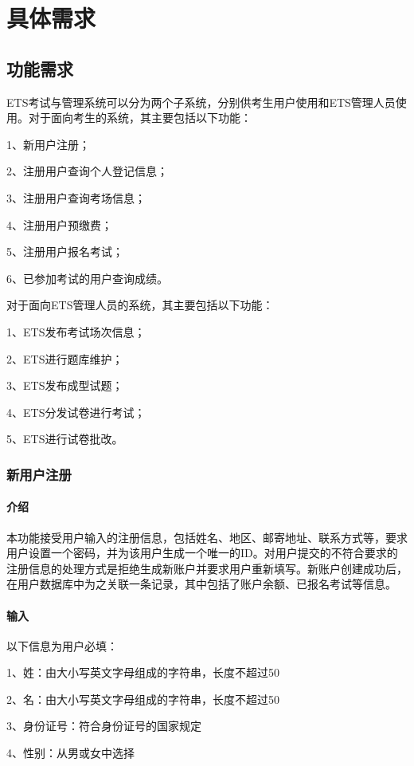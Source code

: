\chapter{具体需求}

\section{功能需求}
ETS考试与管理系统可以分为两个子系统，分别供考生用户使用和ETS管理人员使用。对于面向考生的系统，其主要包括以下功能：

1、新用户注册；

2、注册用户查询个人登记信息；

3、注册用户查询考场信息；

4、注册用户预缴费；

5、注册用户报名考试；

6、已参加考试的用户查询成绩。

对于面向ETS管理人员的系统，其主要包括以下功能：

1、ETS发布考试场次信息；

2、ETS进行题库维护；

3、ETS发布成型试题；

4、ETS分发试卷进行考试；

5、ETS进行试卷批改。

\subsection{新用户注册}

\subsubsection{介绍}
本功能接受用户输入的注册信息，包括姓名、地区、邮寄地址、联系方式等，要求用户设置一个密码，并为该用户生成一个唯一的ID。对用户提交的不符合要求的注册信息的处理方式是拒绝生成新账户并要求用户重新填写。新账户创建成功后，在用户数据库中为之关联一条记录，其中包括了账户余额、已报名考试等信息。

\subsubsection{输入}
以下信息为用户必填：

1、姓：由大小写英文字母组成的字符串，长度不超过50

2、名：由大小写英文字母组成的字符串，长度不超过50

3、身份证号：符合身份证号的国家规定

4、性别：从男或女中选择

